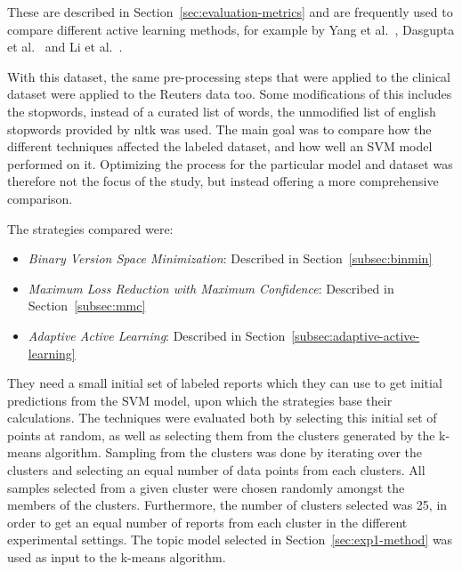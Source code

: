 These are described in Section~\ref{sec:evaluation-metrics} and are frequently used to compare different active learning methods, for example by Yang et al\@.~\cite{yang2009effective}, Dasgupta et al\@.~\cite{dasgupta2008hierarchical} and Li et al\@.~\cite{li2013active}.

With this dataset, the same pre-processing steps that were applied to the clinical dataset were applied to the Reuters data too.
Some modifications of this includes the stopwords, instead of a curated list of words, the unmodified list of english stopwords provided by nltk was used.
The main goal was to compare how the different techniques affected the labeled dataset, and how well an SVM model performed on it.
Optimizing the process for the particular model and dataset was therefore not the focus of the study, but instead offering a more comprehensive comparison.

The strategies compared were: 
\begin{itemize}
    \item \textit{Binary Version Space Minimization}: Described in Section~\ref{subsec:binmin}
    \item \textit{Maximum Loss Reduction with Maximum Confidence}: Described in Section~\ref{subsec:mmc}
    \item \textit{Adaptive Active Learning}: Described in Section~\ref{subsec:adaptive-active-learning}
\end{itemize}
They need a small initial set of labeled reports which they can use to get initial predictions from the SVM model, upon which the strategies base their calculations.
The techniques were evaluated both by selecting this initial set of points at random, as well as selecting them from the clusters generated by the k-means algorithm.
Sampling from the clusters was done by iterating over the clusters and selecting an equal number of data points from each clusters.
All samples selected from a given cluster were chosen randomly amongst the members of the clusters.
Furthermore, the number of clusters selected was 25, in order to get an equal number of reports from each cluster in the different experimental settings.
The topic model selected in Section~\ref{sec:exp1-method} was used as input to the k-means algorithm.

